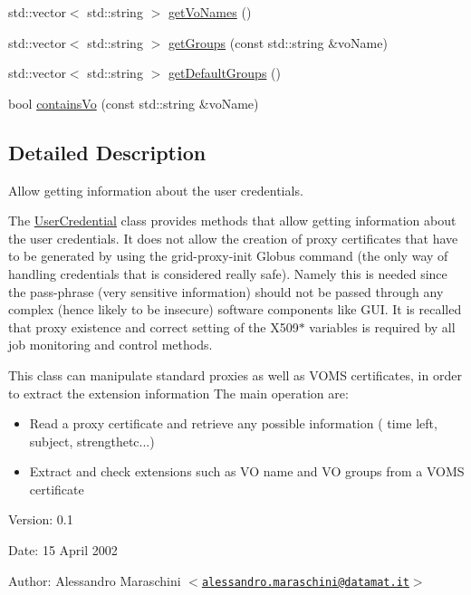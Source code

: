 \begin{CompactItemize}
\item 
std::vector$<$ std::string $>$ \hyperlink{classglite_1_1wmsui_1_1api_1_1UserCredential_a10}{get\-Vo\-Names} ()
\item 
std::vector$<$ std::string $>$ \hyperlink{classglite_1_1wmsui_1_1api_1_1UserCredential_a11}{get\-Groups} (const std::string \&vo\-Name)
\item 
std::vector$<$ std::string $>$ \hyperlink{classglite_1_1wmsui_1_1api_1_1UserCredential_a12}{get\-Default\-Groups} ()
\item 
bool \hyperlink{classglite_1_1wmsui_1_1api_1_1UserCredential_a13}{contains\-Vo} (const std::string \&vo\-Name)
\end{CompactItemize}


\subsection{Detailed Description}
Allow getting information about the user credentials. 

The \hyperlink{classglite_1_1wmsui_1_1api_1_1UserCredential}{User\-Credential} class provides methods that allow getting information about the user credentials. It does not allow the creation of proxy certificates that have to be generated by using the grid-proxy-init Globus command (the only way of handling credentials that is considered really safe). Namely this is needed since the pass-phrase (very sensitive information) should not be passed through any complex (hence likely to be insecure) software components like GUI. It is recalled that proxy existence and correct setting of the X509$\ast$ variables is required by all job monitoring and control methods. 

This class can manipulate standard proxies as well as VOMS certificates, in order to extract the extension information The main operation are: \begin{itemize}
\item Read a proxy certificate and retrieve any possible information ( time left, subject, strengthetc...) \item Extract and check extensions such as VO name and VO groups from a VOMS certificate \end{itemize}


\begin{Desc}
\item[Version:]0.1 \end{Desc}
\begin{Desc}
\item[Date:]15 April 2002 \end{Desc}
\begin{Desc}
\item[Author:]Alessandro Maraschini $<$\href{mailto:alessandro.maraschini@datamat.it}{\tt alessandro.maraschini@datamat.it}$>$ \end{Desc}




